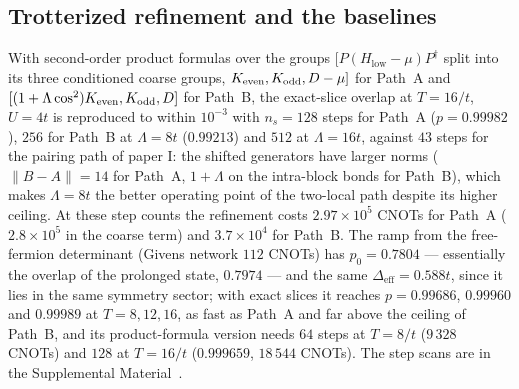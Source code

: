 \documentclass[a4paper,11pt,noarxiv]{quantumarticle}
\newcommand{\Hlow}{H_{\mathrm{low}}}
\newcommand{\Deff}{\Delta_{\mathrm{eff}}}
\newcommand{\SM}{Supplemental Material~\cite{SM}}
\begin{document}
\subsection{Trotterized refinement and the baselines}
With second-order product formulas over the groups
$[P(\Hlow-\mu)P^\dagger$ split into its three conditioned coarse groups,
$K_{\rm even},K_{\rm odd},D-\mu]$ for Path~A and
$[(1+\Lambda\cos^2)K_{\rm even},K_{\rm odd},D]$ for Path~B, the exact-slice
overlap at $T=16/t$, $U=4t$ is reproduced to within $10^{-3}$ with
$n_s=128$ steps for Path~A ($p=0.99982$), $256$ for Path~B at $\Lambda=8t$
($0.99213$) and $512$ at $\Lambda=16t$, against $43$ steps for the pairing
path of paper I: the shifted generators have larger norms ($\|B-A\|=14$ for
Path~A, $1+\Lambda$ on the intra-block bonds for Path~B), which makes
$\Lambda=8t$ the better operating point of the two-local path despite its
higher ceiling.  At these step counts the refinement costs
$2.97\times10^5$ CNOTs for Path~A ($2.8\times10^5$ in the coarse term) and
$3.7\times10^4$ for Path~B.  The ramp from the free-fermion determinant
(Givens network $112$ CNOTs) has $p_0=0.7804$ --- essentially the overlap
of the prolonged state, $0.7974$ --- and the same $\Deff=0.588t$, since it
lies in the same symmetry sector; with exact slices it reaches
$p=0.99686$, $0.99960$ and $0.99989$ at $T=8,12,16$, as fast as Path~A and
far above the ceiling of Path~B, and its product-formula version needs
$64$ steps at $T=8/t$ ($9\,328$ CNOTs) and $128$ at $T=16/t$
($0.999659$, $18\,544$ CNOTs).  The step scans are in the \SM.
\end{document}
